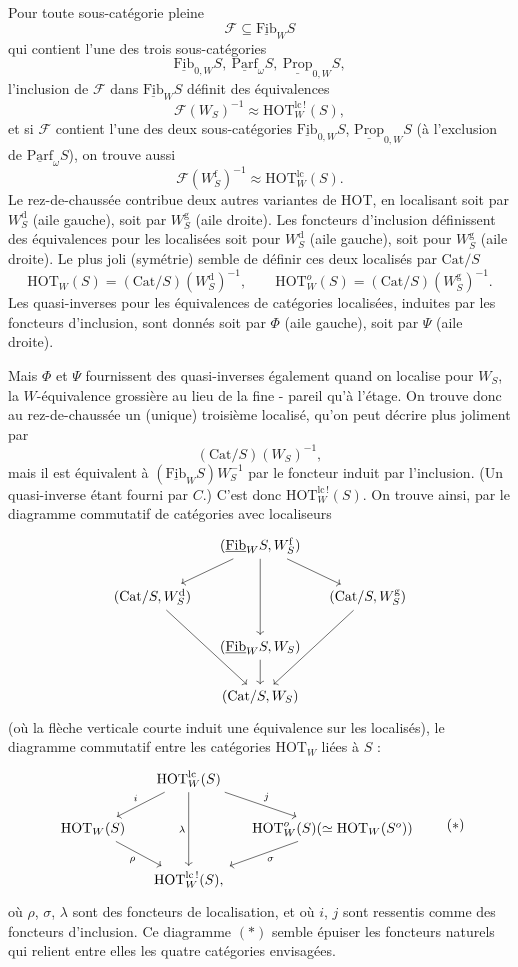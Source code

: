 \documentclass[11pt]{article}
\newcommand{\printedpage}[1]{\marginpar{\footnotesize p.~#1}}
\newcommand{\msp}[1]{\marginpar{\footnotesize [#1]}}
\newcommand{\HOT}{\mathrm{HOT}}
\newcommand{\Cat}{\mathrm{Cat}}
\newcommand{\Fib}{\underline{\mathrm{Fib}}}
\newcommand{\Parf}{\underline{\mathrm{Parf}}}
\newcommand{\Prop}{\underline{\mathrm{Prop}}}
\newcommand{\lcs}{\mathrm{lc}\,!}
\begin{document}
\printedpage{109}

\noindent\msp{page 177}
Pour toute sous-catégorie pleine
\[
\mathcal{F} \subseteq \Fib_W S
\]
qui contient l’une des trois sous-catégories
\[
\Fib_{0,W}S,\ \Parf_\omega S,\ \Prop_{0,W}S,
\]
l’inclusion de $\mathcal{F}$ dans $\Fib_W S$ définit des équivalences
\[
\mathcal{F}(W_S)^{-1} \approx \HOT^{\lcs}_W(S),
\]
et si $\mathcal{F}$ contient l’une des deux sous-catégories $\Fib_{0,W}S$, $\Prop_{0,W}S$ (à l’exclusion de $\Parf_\omega S$), on trouve aussi
\[
\mathcal{F}(W^{\mathrm{f}}_S)^{-1} \approx \HOT^{\mathrm{lc}}_W(S).
\]
Le rez-de-chaussée contribue deux autres variantes de HOT, en localisant soit par $W^{\mathrm{d}}_S$ (aile gauche), soit par $W^{\mathrm{g}}_S$ (aile droite). Les foncteurs d’inclusion définissent des équivalences pour les localisées soit pour $W^{\mathrm{d}}_S$ (aile gauche), soit pour $W^{\mathrm{g}}_S$ (aile droite). Le plus joli (symétrie) semble de définir ces deux localisés par $\Cat/S$
\[
\HOT_W(S) = (\Cat/S)(W^{\mathrm{d}}_S)^{-1}, \qquad \HOT^{o}_W(S) = (\Cat/S)(W^{\mathrm{g}}_S)^{-1}.
\]
Les quasi-inverses pour les équivalences de catégories localisées, induites par les foncteurs d’inclusion, sont donnés soit par $\Phi$ (aile gauche), soit par $\Psi$ (aile droite).

Mais $\Phi$ et $\Psi$ fournissent des quasi-inverses également quand on localise pour $W_S$, la $W$-équivalence grossière au lieu de la fine - pareil qu’à l’étage. On trouve donc au rez-de-chaussée un (unique) troisième localisé, qu’on peut décrire plus joliment par
\[
(\Cat/S)(W_S)^{-1},
\]
mais il est équivalent à $(\Fib_W S)W_S^{-1}$ par le
\msp{page 178}
foncteur induit par l’inclusion. (Un quasi-inverse étant fourni par $C$.) C’est donc $\HOT^{\lcs}_W(S)$. On trouve ainsi, par le diagramme commutatif de catégories avec localiseurs
\[
\begin{tikzcd}[column sep=small]
 & (\Fib_W S, W^{\mathrm{f}}_S) \arrow[dl] \arrow[dd] \arrow[dr] & \\
(\Cat/S, W^{\mathrm{d}}_S) \arrow[ddr] & & (\Cat/S, W^{\mathrm{g}}_S) \arrow[ddl] \\
 & (\Fib_W S, W_S) \arrow[d] & \\
 & (\Cat/S, W_S) &
\end{tikzcd}
\]
\printedpage{110}
(où la flèche verticale courte induit une équivalence sur les localisés), le diagramme commutatif entre les catégories $\HOT_W$ liées à $S$ :
\[
\begin{tikzcd}[column sep=small]
 & \HOT^{\mathrm{lc}}_W(S) \arrow[dl, "i"'] \arrow[dd, "\lambda"'] \arrow[dr, "j"] & \\
\HOT_W(S) \arrow[dr, "\rho"'] & & \HOT^{o}_W(S)(\simeq \HOT_W(S^{o})) \arrow[dl, "\sigma"] \\
 & \HOT^{\lcs}_W(S), &
\end{tikzcd}
\tag*{$(\ast)$}
\]
où $\rho$, $\sigma$, $\lambda$ sont des foncteurs de localisation, et où $i$, $j$ sont ressentis comme des foncteurs d’inclusion. Ce diagramme $(\ast)$ semble épuiser les foncteurs naturels qui relient entre elles les quatre catégories envisagées.
\end{document}
